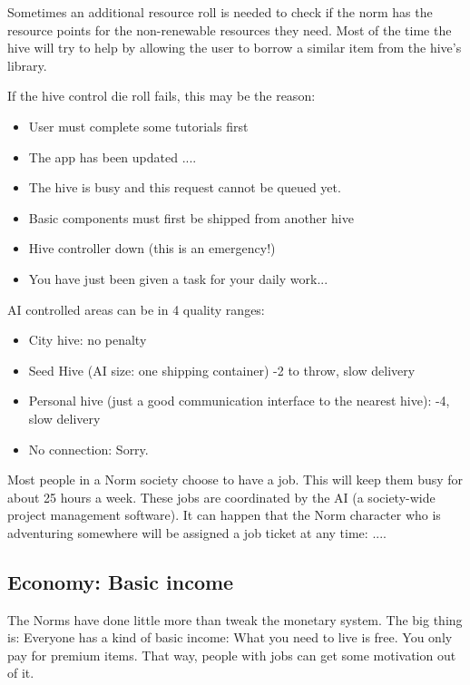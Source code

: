 Sometimes an additional resource roll is needed to check if the norm has the resource points for the non-renewable resources they need. Most of the time the hive will try to help by allowing the user to borrow a similar item from the hive's library.

If the hive control die roll fails, this may be the reason:
\begin{itemize}
    \item User must complete some tutorials first
    \item The app has been updated ....
    \item The hive is busy and this request cannot be queued yet.
    \item Basic components must first be shipped from another hive
    \item Hive controller down (this is an emergency!)
    \item You have just been given a task for your daily work...
\end{itemize}

AI controlled areas can be in 4 quality ranges:

\begin{itemize}
    \item City hive: no penalty
    \item Seed Hive (AI size: one shipping container) -2 to throw, slow delivery
    \item Personal hive (just a good communication interface to the nearest hive): -4, slow delivery
    \item No connection: Sorry.
\end{itemize}

Most people in a Norm society choose to have a job. This will keep them busy for about 25 hours a week. These jobs are coordinated by the AI (a society-wide project management software). It can happen that the Norm character who is adventuring somewhere will be assigned a job ticket at any time: ....

\subsection{Economy: Basic income}
\label{sec:basic income}

The Norms have done little more than tweak the monetary system. The big thing is: Everyone has a kind of basic income: What you need to live is free.
You only pay for premium items. That way, people with jobs can get some motivation out of it.

